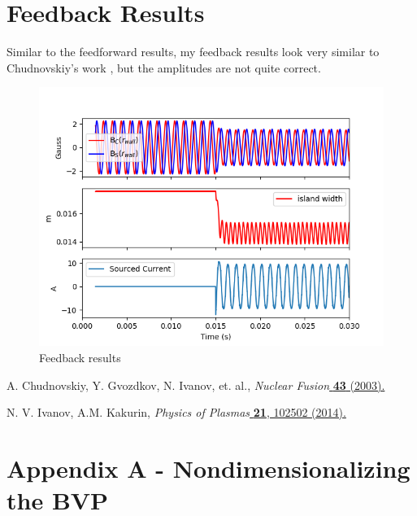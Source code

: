 \documentclass{article}
\begin{document}
\section{Feedback Results}

Similar to the feedforward results, my feedback results look very similar to Chudnovskiy's work \cite{2003}, but the amplitudes are not quite correct.  

\begin{figure}[htb]
	\includegraphics[width=15cm]{images/feedbackResults.png}
	\caption{Feedback results
		\label{fig:FFResults}}    
\end{figure} 



\begin{thebibliography}{}

A. Chudnovskiy, Y. Gvozdkov, N. Ivanov, et. al.,
\emph{Nuclear Fusion}\href{http://iopscience.iop.org/article/10.1088/0029-5515/43/8/307/meta}{
{\bf 43} (2003). 
}


N. V. Ivanov, A.M. Kakurin,
\emph{Physics of Plasmas}\href{https://aip.scitation.org/doi/10.1063/1.4897174}{
{\bf 21}, 102502 (2014). 
}


\end{thebibliography}

\section*{Appendix A - Nondimensionalizing the BVP}
\end{document}
